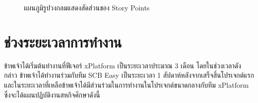 \begin{figure} [H]
    \begin{center}
    \end{center}
    \caption[แผนภูมิรูปวงกลมแสดงสัดส่วนของ Story Points]{แผนภูมิรูปวงกลมแสดงสัดส่วนของ Story Points}
    \label{fig:story-point-pie-chart}
\end{figure}

\section{ช่วงระยะเวลาการทำงาน}ข้าพเจ้าได้เริ่มต้นทำงานที่ฟีเจอร์ xPlatform เป็นระยะเวลาประมาณ 3 เดือน โดยในช่วงเวลาดังกล่าว ข้าพเจ้าได้ทำงานร่วมกับทีม SCB Easy เป็นระยะเวลา 1 สัปดาห์หลังจากเสร็จสิ้นโปรเจกต์แรก และในระยะเวลาที่เหลือข้าพเจ้าได้มีส่วนร่วมในการทำงานในโปรเจกต์ขนาดกลางกับทีม xPlatform ซึ่งจะได้แผนปฏิบัติงานสหกิจศึกษาดังนี้

\newcommand{\gantttitlevertical}[1]{\gantttitle{\rotatebox{90}{#1}}{1}}
\newcommand{\gantttitles}[2]{%
  \foreach \x in {#1} {%
    \gantttitle{\x}{#2}%
  }%
}
\newcommand{\blackcell}{
    \ganttbar[bar/.append style={fill opacity=1, pattern=crosshatch, pattern color=black},progress=100,inline=false]{}{16}{16}}

